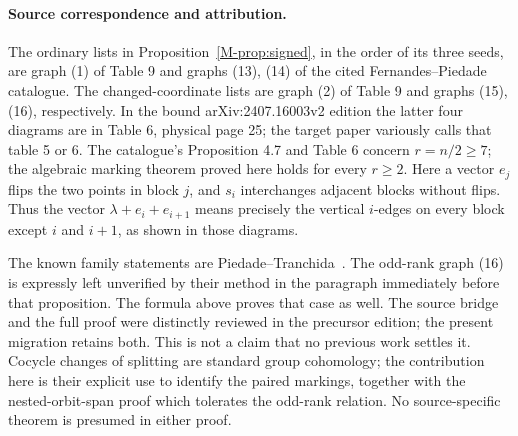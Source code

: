 \paragraph{Source correspondence and attribution.}
The ordinary lists in Proposition~\ref{M-prop:signed}, in the order of
its three seeds, are graph (1) of Table 9 and graphs (13), (14) of the
cited Fernandes--Piedade catalogue. The changed-coordinate lists are
graph (2) of Table 9 and graphs (15), (16), respectively. In the bound
arXiv:2407.16003v2 edition the latter four diagrams are in Table 6,
physical page 25; the target paper variously calls that table 5 or 6.
The catalogue's Proposition 4.7 and Table 6 concern $r=n/2\geq7$;
the algebraic marking theorem proved here holds for every $r\geq2$.
Here a vector $e_j$ flips the two points in block $j$, and $s_i$
interchanges adjacent blocks without flips. Thus the vector
$\lambda+e_i+e_{i+1}$ means precisely the vertical $i$-edges on every
block except $i$ and $i+1$, as shown in those diagrams.

The known family statements are Piedade--Tranchida~\cite[Proposition 5.1]{N006}.
The odd-rank graph (16) is expressly left unverified by their method
in the paragraph immediately before that proposition. The formula
above proves that case as well. The source bridge and the full proof were distinctly reviewed in the precursor edition; the present migration retains both. This is not a claim that no previous work settles it. Cocycle
changes of splitting are standard group cohomology; the contribution
here is their explicit use to identify the paired markings, together
with the nested-orbit-span proof which tolerates the odd-rank relation.
No source-specific theorem is presumed in either proof.
